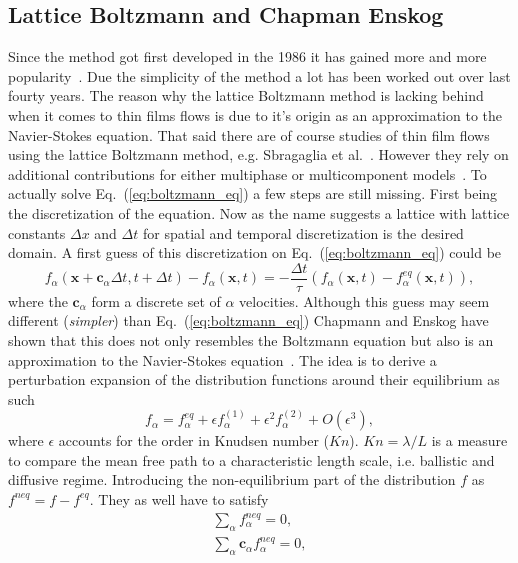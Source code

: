 \subsection{Lattice Boltzmann and Chapman Enskog}
Since the method got first developed in the 1986 it has gained more and more popularity~\cite{PhysRevLett.56.1505}.
Due the simplicity of the method a lot has been worked out over last fourty years.
The reason why the lattice Boltzmann method is lacking behind when it comes to thin films flows is due to it's origin as an approximation to the Navier-Stokes equation.
That said there are of course studies of thin film flows using the lattice Boltzmann method, e.g. Sbragaglia et al.~\cite{Sbragaglia}.
However they rely on additional contributions for either multiphase or multicomponent models~\cite{shan1993lattice, shan_yuan_chen_2006, CHEN1995617}.
To actually solve Eq.~(\ref{eq:boltzmann_eq}) a few steps are still missing.
First being the discretization of the equation.
Now as the name suggests a lattice with lattice constants $\Delta x$ and $\Delta t$ for spatial and temporal discretization is the desired domain.
A first guess of this discretization on Eq.~(\ref{eq:boltzmann_eq}) could be
\begin{equation}\label{eq:LBM_discret_noforces}
    f_{\alpha}(\mathbf{x}+\mathbf{c}_{\alpha}\Delta t, t+ \Delta t) - f_{\alpha}(\mathbf{x}, t) = -\frac{\Delta t}{\tau}(f_{\alpha}(\mathbf{x}, t) - f^{eq}_{\alpha}(\mathbf{x}, t)),
\end{equation}
where the $\mathbf{c}_{\alpha}$ form a discrete set of $\alpha$ velocities.
Although this guess may seem different (\textit{simpler}) than Eq.~(\ref{eq:boltzmann_eq}) Chapmann and Enskog have shown that this does not only resembles the Boltzmann equation but also is an approximation to the Navier-Stokes equation~\cite{Chapman, Enskog}. 
The idea is to derive a perturbation expansion of the distribution functions around their equilibrium as such
\begin{equation}\label{eq:expansion_f}
    f_{\alpha} = f_{\alpha}^{eq} + \epsilon f_{\alpha}^{(1)} + \epsilon^2 f_{\alpha}^{(2)} + O(\epsilon^3), 
\end{equation}
where $\epsilon$ accounts for the order in Knudsen number ($Kn$). 
$Kn = \lambda/L$ is a measure to compare the mean free path to a characteristic length scale, i.e. ballistic and diffusive regime.
Introducing the non-equilibrium part of the distribution $f$ as $f^{neq} = f - f^{eq}$. 
They as well have to satisfy 
\begin{align}\label{eq:non_constraint}
    \sum_{\alpha} f_{\alpha}^{neq} = 0, \\
    \sum_{\alpha} \mathbf{c}_{\alpha}f_{\alpha}^{neq} = 0, 
\end{align}
